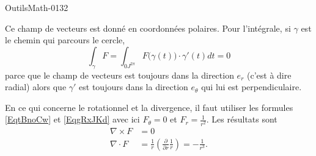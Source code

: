 
\begin{corrige}{OutilsMath-0132}

    Ce champ de vecteurs est donné en coordonnées polaires. Pour l'intégrale, si \( \gamma\) est le chemin qui parcours le cercle,
    \begin{equation}
        \int_{\gamma}F=\int_{0J^{2\pi}}F\big( \gamma(t) \big)\cdot \gamma'(t)dt=0
    \end{equation}
    parce que le champ de vecteurs est toujours dans la direction \( e_r\) (c'est à dire radial) alors que \( \gamma'\) est toujours dans la direction \( e_{\theta}\) qui lui est perpendiculaire.

    En ce qui concerne le rotationnel et la divergence, il faut utiliser les formules \eqref{EqtBnoCw} et \eqref{EqgRxJKd} avec ici \( F_{\theta}=0\) et \( F_r=\frac{1}{ r^2 }\). Les résultats sont
    \begin{subequations}
        \begin{align}
            \nabla\times F&=0\\
            \nabla\cdot F&=\frac{1}{ r }\left( \frac{ \partial  }{ \partial r }\frac{1}{ r } \right)=-\frac{1}{ r^3 }.
        \end{align}
    \end{subequations}

\end{corrige}
